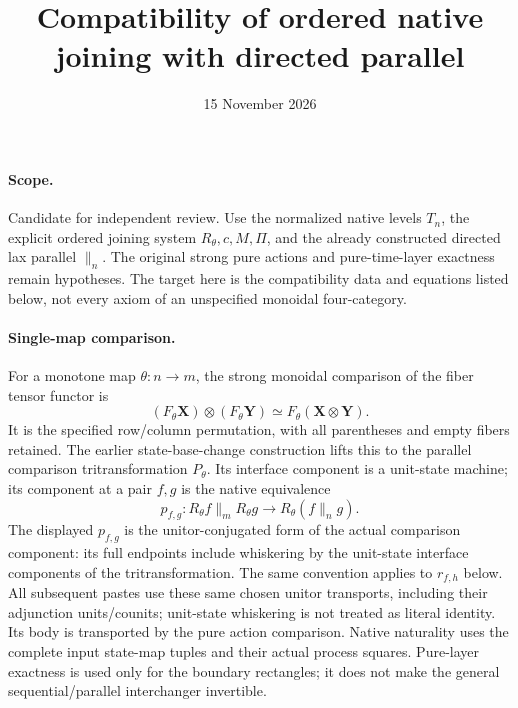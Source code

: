 \documentclass{article}
\title{Compatibility of ordered native joining with directed parallel}
\date{15 November 2026}
\begin{document}
\maketitle
\paragraph{Scope.} Candidate for independent review. Use the normalized native levels $T_n$, the explicit ordered joining system $R_\theta,c,M,\Pi$, and the already constructed directed lax parallel $\parallel_n$. The original strong pure actions and pure-time-layer exactness remain hypotheses. The target here is the compatibility data and equations listed below, not every axiom of an unspecified monoidal four-category.

\paragraph{Single-map comparison.} For a monotone map $\theta:n\to m$, the strong monoidal comparison of the fiber tensor functor is
\[
 (F_\theta\mathbf X)\otimes(F_\theta\mathbf Y)
 \simeq F_\theta(\mathbf X\otimes\mathbf Y).
\]
It is the specified row/column permutation, with all parentheses and empty fibers retained. The earlier state-base-change construction lifts this to the parallel comparison tritransformation $P_\theta$. Its interface component is a unit-state machine; its component at a pair $f,g$ is the native equivalence
\[
 p_{f,g}:R_\theta f\parallel_m R_\theta g
 \longrightarrow R_\theta(f\parallel_n g).
\]
The displayed $p_{f,g}$ is the unitor-conjugated form of the actual comparison component: its full endpoints include whiskering by the unit-state interface components of the tritransformation. The same convention applies to $r_{f,h}$ below. All subsequent pastes use these same chosen unitor transports, including their adjunction units/counits; unit-state whiskering is not treated as literal identity. Its body is transported by the pure action comparison. Native naturality uses the complete input state-map tuples and their actual process squares. Pure-layer exactness is used only for the boundary rectangles; it does not make the general sequential/parallel interchanger invertible.
\end{document}
